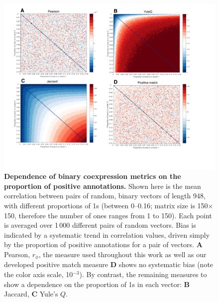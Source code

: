 \documentclass[10pt,letterpaper]{article}
\begin{document}

\begin{figure}[h]
\centering
    \includegraphics[width=1\textwidth]{CoexpressionMeasures.pdf}
\caption{
\label{fig:S_propOnes}
\textbf{Dependence of binary coexpression metrics on the proportion of positive annotations.}
Shown here is the mean correlation between pairs of random, binary vectors of length 948, with different proportions of 1s (between 0--0.16; matrix size is 150$\times$150, therefore the number of ones ranges from 1 to 150).
Each point is averaged over 1\,000 different pairs of random vectors.
Bias is indicated by a systematic trend in correlation values, driven simply by the proportion of positive annotations for a pair of vectors.
\textbf{A} Pearson, $r_\phi$, the measure used throughout this work as well as our developed positive match measure \textbf{D} shows no systematic bias (note the color axis scale, 10$^{-3}$).
By contrast, the remaining measures to show a dependence on the proportion of 1s in each vector:
\textbf{B} Jaccard,
\textbf{C} Yule's $Q$.
}
\end{figure}
\end{document}
